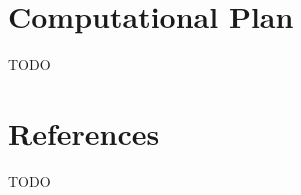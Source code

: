 \documentclass[fontsize=11pt]{article}
\begin{document}
\section*{Computational Plan}

TODO

\section*{References}

TODO

\end{document}
